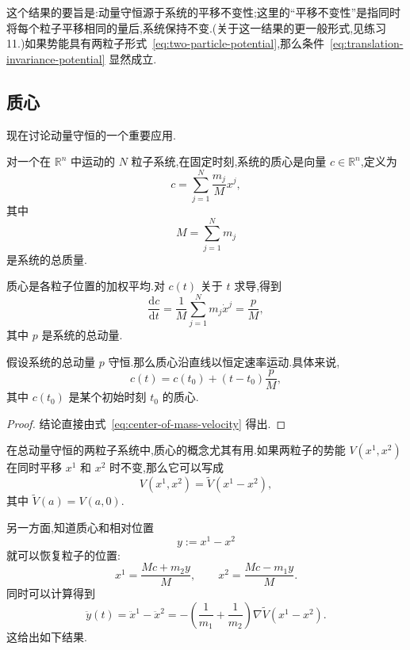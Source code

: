这个结果的要旨是:动量守恒源于系统的平移不变性;这里的“平移不变性”是指同时将每个粒子平移相同的量后,系统保持不变.(关于这一结果的更一般形式,见练习 11.)如果势能具有两粒子形式~\eqref{eq:two-particle-potential},那么条件~\eqref{eq:translation-invariance-potential} 显然成立.

\subsection{质心}

现在讨论动量守恒的一个重要应用.

\begin{definition}[质心]\label{def:center-of-mass}
对一个在 $\mathbb{R}^{n}$ 中运动的 $N$ 粒子系统,在固定时刻,系统的质心是向量 $c\in\mathbb{R}^{n}$,定义为
\[
  c=\sum_{j=1}^{N}\frac{m_{j}}{M}x^{j},
\]
其中
\[
  M=\sum_{j=1}^{N}m_{j}
\]
是系统的总质量.
\end{definition}

质心是各粒子位置的加权平均.对 $c(t)$ 关于 $t$ 求导,得到
\begin{equation}
  \frac{\mathrm{d}c}{\mathrm{d}t}
  =\frac{1}{M}\sum_{j=1}^{N}m_{j}\dot{x}^{j}
  =\frac{p}{M},
  \label{eq:center-of-mass-velocity}
\end{equation}
其中 $p$ 是系统的总动量.

\begin{proposition}[质心的匀速直线运动]\label{pro:center-of-mass-motion}
假设系统的总动量 $p$ 守恒.那么质心沿直线以恒定速率运动.具体来说,
\begin{equation}
  c(t)=c(t_{0})+(t-t_{0})\frac{p}{M},
  \label{eq:center-of-mass-line}
\end{equation}
其中 $c(t_{0})$ 是某个初始时刻 $t_{0}$ 的质心.
\end{proposition}

\begin{proof}
结论直接由式~\eqref{eq:center-of-mass-velocity} 得出.
\end{proof}

在总动量守恒的两粒子系统中,质心的概念尤其有用.如果两粒子的势能 $V(x^{1},x^{2})$ 在同时平移 $x^{1}$ 和 $x^{2}$ 时不变,那么它可以写成
\[
  V(x^{1},x^{2})=\widetilde{V}(x^{1}-x^{2}),
\]
其中 $\widetilde{V}(a)=V(a,0)$.

另一方面,知道质心和相对位置
\[
  y:=x^{1}-x^{2}
\]
就可以恢复粒子的位置:
\[
  x^{1}=\frac{Mc+m_{2}y}{M},
  \qquad
  x^{2}=\frac{Mc-m_{1}y}{M}.
\]
同时可以计算得到
\[
  \ddot{y}(t)=\ddot{x}^{1}-\ddot{x}^{2}
  =-\left(\frac{1}{m_{1}}+\frac{1}{m_{2}}\right)\nabla\widetilde{V}(x^{1}-x^{2}).
\]
这给出如下结果.


